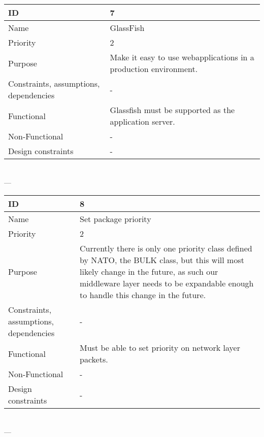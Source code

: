 \begin{center}
    \begin{tabular}{| p{4cm} | p{8cm} |}
        \hline
        ID & 7 \\
        \hline
        Name & GlassFish \\
        \hline
        Priority & 2 \\
        \hline
        Purpose & Make it easy to use webapplications in a production environment. \\
        \hline 
        Constraints, assumptions, dependencies & - \\
        \hline  
        Functional & Glassfish must be supported as the application server.  \\
        \hline
        Non-Functional & - \\ 
        \hline
        Design constraints & - \\
        \hline
    \end{tabular}
    \\  ---  \\
    
    \begin{tabular}{| p{4cm} | p{8cm} |}
        \hline
        ID & 8 \\
        \hline
        Name & Set package priority \\
        \hline
        Priority & 2 \\
        \hline
        Purpose & Currently there is only one priority class defined by NATO, the BULK class, but this will most likely change in the future, as such our middleware layer needs to be expandable enough to handle this change in the future. \\
        \hline 
        Constraints, assumptions, dependencies & -\\
        \hline  
        Functional & Must be able to set priority on network layer packets.\\
        \hline
        Non-Functional & -\\ 
        \hline
        Design constraints & - \\
        \hline
    \end{tabular}
    \\  ---  \\
    

\end{center}
